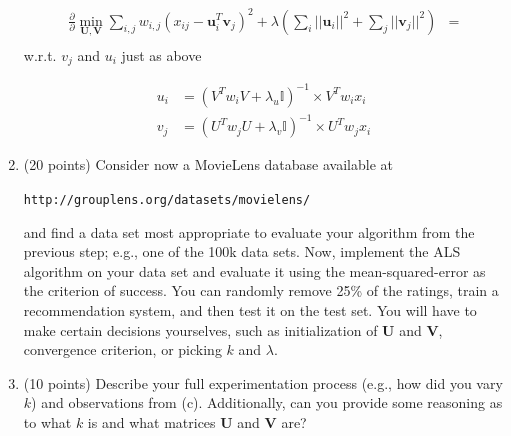 \documentclass[twoside]{article}
\begin{document}
\begin{enumerate}
\begin{equation*}
\begin{split}
\frac{\partial}{\partial}\underset{\mathbf{U},\mathbf{V}}{\min}\sum_{i,j}w_{i,j}(x_{ij}-\mathbf{u}_{i}^{T}\mathbf{v}_{j})^{2}+\lambda(\sum_{i}||\mathbf{u}_{i}||^{2}+\sum_{j}||\mathbf{v}_{j}||^{2}) & = \\
\end{split} 
\end{equation*}
w.r.t. $v_j$ and $u_i$ just as above

\begin{equation*}
\begin{split}
u_i &=  (V^Tw_iV + \lambda_u \mathbb{I})^{-1} \times V^Tw_ix_i\\
v_j & = (U^Tw_jU+ \lambda_v \mathbb{I})^{-1} \times U^Tw_jx_i
\end{split} 
\end{equation*}

\item (20 points) Consider now a MovieLens database available at

\begin{center}
\texttt{http://grouplens.org/datasets/movielens/}
\end{center}

and find a data set most appropriate to evaluate your algorithm from the previous step; e.g., one of the 100k data sets. Now, implement the ALS algorithm on your data set and evaluate it using the mean-squared-error as the criterion of success. You can randomly remove 25\% of the ratings, train a recommendation system, and then test it on the test set. You will have to make certain decisions yourselves, such as initialization of $\mathbf{U}$ and $\mathbf{V}$, convergence criterion, or picking $k$ and $\lambda$.

\item (10 points) Describe your full experimentation process (e.g., how did you vary $k$) and observations from (c). Additionally, can you provide some reasoning as to what $k$ is and what matrices $\mathbf{U}$ and $\mathbf{V}$ are?


\end{enumerate}
\end{document}
